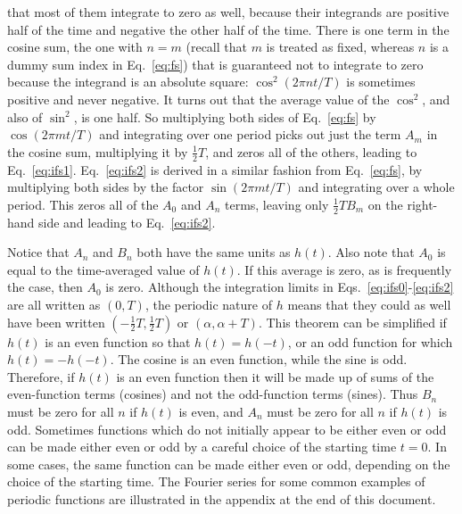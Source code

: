 \documentclass{revtex4}
\begin{document}
that most of them integrate to zero as well, because their integrands
are positive half of the time and negative the other half of the time.
There is one term in the cosine sum, the one with $n=m$ (recall that
$m$ is treated as fixed, whereas $n$ is a dummy sum index in
Eq.~\ref{eq:fs}) that is guaranteed not to integrate to zero because
the integrand is an absolute square: $\cos^2(2\pi nt/T)$ is sometimes
positive and never negative. It turns out that the average value of
the $\cos^2$, and also of $\sin^2$, is one half.  So multiplying
both sides of Eq.~\ref{eq:fs} by $\cos(2\pi mt/T)$ and integrating 
over one period picks out just the term $A_m$ in the cosine sum,
multiplying it by $\frac{1}{2}T$, and zeros all of the others,
leading to Eq.~\ref{eq:ifs1}.  Eq.~\ref{eq:ifs2} is derived in a
similar fashion from Eq.~\ref{eq:fs}, by multiplying both sides by
the factor $\sin(2\pi mt/T)$ and integrating over a whole period.
This zeros all of the $A_0$ and $A_n$ terms, leaving only
$\frac{1}{2}TB_m$ on the right-hand side and leading to Eq.~\ref{eq:ifs2}.

Notice that $A_n$ and $B_n$ both have the same units as $h(t)$. Also
note that $A_0$ is equal to the time-averaged value of $h(t)$. If this
average is zero, as is frequently the case, then $A_0$ is zero.
Although the integration limits in Eqs.~\ref{eq:ifs0}-\ref{eq:ifs2}
are all written as $(0,T)$, the periodic nature of $h$ means that they
could as well have been written $(-\frac{1}{2}T,\frac{1}{2}T)$ or
$(\alpha,\alpha+T)$.  This theorem can be simplified if $h(t)$ is an
even function so that $h(t) = h(-t)$, or an odd function for which
$h(t) = -h(-t)$. The cosine is an even function, while the sine is odd.
Therefore, if $h(t)$ is an even function then it will be made up of sums
of the even-function terms (cosines) and not the odd-function terms (sines).
Thus $B_n$ must be zero for all $n$ if $h(t)$ is even, and $A_n$ must be
zero for all $n$ if $h(t)$ is odd. Sometimes functions which do not
initially appear to be either even or odd can be made either even or odd
by a careful choice of the starting time $t=0$.  In some cases, the same
function can be made either even or odd, depending on the choice of the
starting time.  The Fourier series for some common examples of periodic
functions are illustrated in the appendix at the end of this document.
\end{document}
